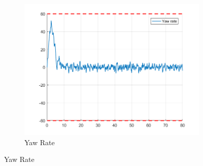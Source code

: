 \documentclass[11pt]{article}
\begin{document}
\begin{enumerate}
\begin{figure}[ht]
\begin{subfigure}[c]{0.3\linewidth}
            \includegraphics[width=\linewidth]{Plots_11_NonlinearModel_StepSignal/09}
            \caption{Yaw Rate}
        \end{subfigure}
        

\end{figure}
\end{enumerate}
\end{document}
